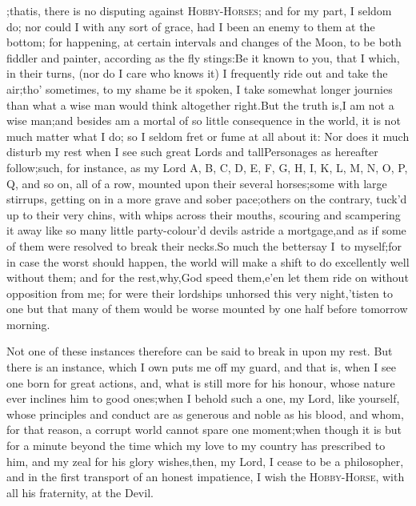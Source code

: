 \documentclass{article}
\begin{document}
\enspace\tsk {};\tsk  that\break is, there is no disputing against
\textsc{Hobby-Horses}; and for my part, I
seldom do; nor could I with any sort of grace, had I been an enemy
to them at the bottom; for happening, at certain intervals and
changes of the Moon, to be both fiddler and painter, according as
the fly stings:\tsk  Be it known to you, that I
which, in their turns, (nor do I care who knows
it) I frequently ride out and take 
the air;\tsk  tho’ sometimes, to my shame\break
be it spoken, I take somewhat longer\break
journies than what a wise man would\break
think altogether right.\tsk  But the truth\break
is,\tsk  I am not a wise man;\tsk  and besides am a mortal of so little consequence in the world,
it is not much matter what I do; so I seldom fret or fume at all
about it: Nor does it much disturb my rest when I see such great
Lords and tall\break Personages as hereafter follow;\tsk  such, for
instance, as my Lord A, B, C, D, E, F, G, H, I, K, L, M, N, O, P,
Q, and so on, all of a row, mounted upon their several
horses;\tsk  some with large stirrups, getting on in a more grave
and sober pace;\tsh  others on the contrary, tuck’d up to
their very chins, with whips across their mouths, scouring and
scampering it away like so many little party-colour’d devils
astride a mortgage,\tsh  and as if\break
some of them were resolved to break\break
their necks.\tsh  So much the better\tsk  say\break
I~to myself;\tsk  for in case the worst should happen, the world will
make a shift to do excellently well without them; and for the
rest,\tsh  why,\tsh  God speed
them,\tsk  e’en let them ride on without opposition
from me; for were their lordships unhorsed this very
night,\tsk  ’tis\break ten to one but that many of them would
be worse mounted by one half before tomorrow
morning.

Not one of these instances therefore can be said to break in upon my rest.\tsk\break
But there is an instance, which I own puts me off my guard, and that is, when I see
one born for great actions, and, what is still more for his honour,
whose nature ever inclines him to good ones;\tsh\break  when I behold such a one, my
Lord, like yourself, whose principles and conduct are as generous and noble as his
blood, and whom, for that reason, a corrupt world cannot spare one moment;\tsk  when
 though it is but for a minute beyond the
time which my love to my country has prescribed to him, and my zeal for his glory
wishes,\tsk  then, my Lord, I cease to be a philosopher, and in the first transport
of an honest impatience, I wish the \textsc{Hobby-Horse}, with all his fraternity,
at the Devil.
\end{document}
